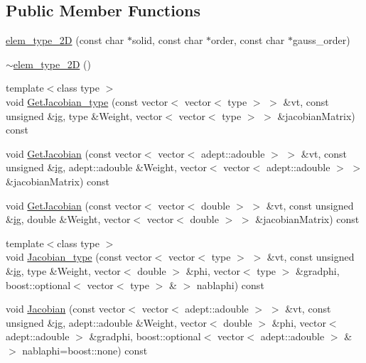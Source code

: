 \subsection*{Public Member Functions}
\begin{DoxyCompactItemize}
\item 
\mbox{\hyperlink{classfemus_1_1elem__type__2_d_a876b8c2f0e759a70fb821ccfebd41994}{elem\+\_\+type\+\_\+2D}} (const char $\ast$solid, const char $\ast$order, const char $\ast$gauss\+\_\+order)
\item 
\mbox{\hyperlink{classfemus_1_1elem__type__2_d_aa6ee09b3178436e9dbb707f62548c21d}{$\sim$elem\+\_\+type\+\_\+2D}} ()
\item 
{\footnotesize template$<$class type $>$ }\\void \mbox{\hyperlink{classfemus_1_1elem__type__2_d_a9d1cc104a524ee4ccc32a9bae6b0cef6}{Get\+Jacobian\+\_\+type}} (const vector$<$ vector$<$ type $>$ $>$ \&vt, const unsigned \&\mbox{\hyperlink{namespacefemus_a6df31099f676311de214a312d7043941}{ig}}, type \&Weight, vector$<$ vector$<$ type $>$ $>$ \&jacobian\+Matrix) const
\item 
void \mbox{\hyperlink{classfemus_1_1elem__type__2_d_a0cd4c80b3b6323d3ab4a57a29ad41034}{Get\+Jacobian}} (const vector$<$ vector$<$ adept\+::adouble $>$ $>$ \&vt, const unsigned \&\mbox{\hyperlink{namespacefemus_a6df31099f676311de214a312d7043941}{ig}}, adept\+::adouble \&Weight, vector$<$ vector$<$ adept\+::adouble $>$ $>$ \&jacobian\+Matrix) const
\item 
void \mbox{\hyperlink{classfemus_1_1elem__type__2_d_ac1fe4b778f06a58de8ad7057fb982a4b}{Get\+Jacobian}} (const vector$<$ vector$<$ double $>$ $>$ \&vt, const unsigned \&\mbox{\hyperlink{namespacefemus_a6df31099f676311de214a312d7043941}{ig}}, double \&Weight, vector$<$ vector$<$ double $>$ $>$ \&jacobian\+Matrix) const
\item 
{\footnotesize template$<$class type $>$ }\\void \mbox{\hyperlink{classfemus_1_1elem__type__2_d_aa4bc7ea3d9b10300367ad23b3ce4f977}{Jacobian\+\_\+type}} (const vector$<$ vector$<$ type $>$ $>$ \&vt, const unsigned \&\mbox{\hyperlink{namespacefemus_a6df31099f676311de214a312d7043941}{ig}}, type \&Weight, vector$<$ double $>$ \&phi, vector$<$ type $>$ \&gradphi, boost\+::optional$<$ vector$<$ type $>$ \& $>$ nablaphi) const
\item 
void \mbox{\hyperlink{classfemus_1_1elem__type__2_d_af8ad48cebf3ed72aa7d718129bbc381f}{Jacobian}} (const vector$<$ vector$<$ adept\+::adouble $>$ $>$ \&vt, const unsigned \&\mbox{\hyperlink{namespacefemus_a6df31099f676311de214a312d7043941}{ig}}, adept\+::adouble \&Weight, vector$<$ double $>$ \&phi, vector$<$ adept\+::adouble $>$ \&gradphi, boost\+::optional$<$ vector$<$ adept\+::adouble $>$ \& $>$ nablaphi=boost\+::none) const

\end{DoxyCompactItemize}
